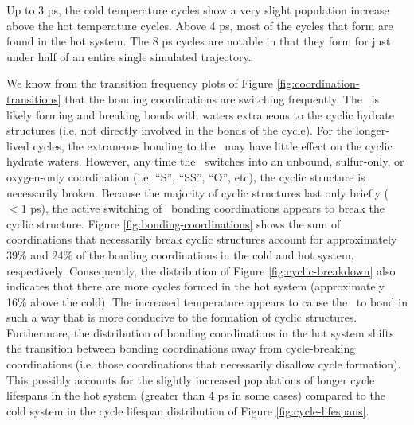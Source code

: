 Up to 3 ps, the cold temperature cycles show a very slight population increase above the hot temperature cycles. Above 4 ps, most of the cycles that form are found in the hot system. The 8 ps cycles are notable in that they form  for just under half of an entire single simulated trajectory.

We know from the transition frequency plots of Figure \ref{fig:coordination-transitions} that the bonding coordinations are switching frequently. The \suldiox~is likely forming and breaking bonds with waters extraneous to the cyclic hydrate structures (i.e. not directly involved in the bonds of the cycle). For the longer-lived cycles, the extraneous bonding to the \suldiox~may have little effect on the cyclic hydrate waters. However, any time the \suldiox~switches into an unbound, sulfur-only, or oxygen-only coordination (i.e. ``S'', ``SS'', ``O'', etc), the cyclic structure is necessarily broken. Because the majority of cyclic structures last only briefly ($<1$ ps), the active switching of \suldiox~bonding coordinations appears to break the cyclic structure. Figure \ref{fig:bonding-coordinations} shows the sum of coordinations that necessarily break cyclic structures account for approximately 39\% and 24\% of the bonding coordinations in the cold and hot system, respectively. Consequently, the distribution of Figure \ref{fig:cyclic-breakdown} also indicates that there are more cycles formed in the hot system (approximately 16\% above the cold). The increased temperature appears to cause the \suldiox~to bond in such a way that is more conducive to the formation of cyclic structures. Furthermore, the distribution of bonding coordinations in the hot system shifts the transition between bonding coordinations away from cycle-breaking coordinations (i.e. those coordinations that necessarily disallow cycle formation). This possibly accounts for the slightly increased populations of longer cycle lifespans in the hot system (greater than 4 ps in some cases) compared to the cold system in the cycle lifespan distribution of Figure \ref{fig:cycle-lifespans}. 

